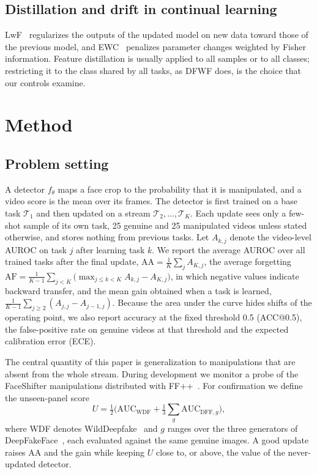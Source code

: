 \documentclass{ieeeaccess}
\newcommand{\ffpp}{FF{+}{+}}
\begin{document}
\subsection{Distillation and drift in continual learning}
LwF~\cite{li2018lwf} regularizes the outputs of the updated model on new data toward those of the previous model, and EWC~\cite{kirkpatrick2017ewc} penalizes parameter changes weighted by Fisher information. Feature distillation is usually applied to all samples or to all classes; restricting it to the class shared by all tasks, as DFWF does, is the choice that our controls examine.

\section{Method}
\label{sec:method}

\subsection{Problem setting}
\label{sec:problem}

A detector $f_\theta$ maps a face crop to the probability that it is manipulated, and a video score is the mean over its frames. The detector is first trained on a base task $\mathcal{T}_1$ and then updated on a stream $\mathcal{T}_2,\dots,\mathcal{T}_K$. Each update sees only a few-shot sample of its own task, 25 genuine and 25 manipulated videos unless stated otherwise, and stores nothing from previous tasks. Let $A_{k,j}$ denote the video-level AUROC on task $j$ after learning task $k$. We report the average AUROC over all trained tasks after the final update, $\mathrm{AA}=\frac{1}{K}\sum_{j}A_{K,j}$, the average forgetting $\mathrm{AF}=\frac{1}{K-1}\sum_{j<K}\big(\max_{j\le k<K}A_{k,j}-A_{K,j}\big)$, in which negative values indicate backward transfer, and the mean gain obtained when a task is learned, $\frac{1}{K-1}\sum_{j\ge2}(A_{j,j}-A_{j-1,j})$. Because the area under the curve hides shifts of the operating point, we also report accuracy at the fixed threshold 0.5 (ACC@0.5), the false-positive rate on genuine videos at that threshold and the expected calibration error (ECE).

The central quantity of this paper is generalization to manipulations that are absent from the whole stream. During development we monitor a probe of the FaceShifter manipulations distributed with \ffpp{}~\cite{rossler2019faceforensics}. For confirmation we define the unseen-panel score
\begin{equation}
U=\tfrac{1}{2}\Big(\mathrm{AUC}_{\mathrm{WDF}}+\tfrac{1}{3}\sum_{g}\mathrm{AUC}_{\mathrm{DFF},g}\Big),
\end{equation}
where WDF denotes WildDeepfake~\cite{zi2020wilddeepfake} and $g$ ranges over the three generators of DeepFakeFace~\cite{song2023deepfakeface}, each evaluated against the same genuine images. A good update raises AA and the gain while keeping $U$ close to, or above, the value of the never-updated detector.
\end{document}
